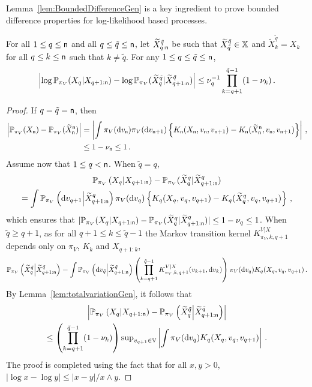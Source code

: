 \noindent
Lemma~\ref{lem:BoundedDifferenceGen} is a key ingredient to prove bounded difference properties for log-likelihood based processes.
\begin{lemma}\label{lem:BoundedDifferenceGen}
For all $1\le q\le {\mathsf n}$ and all $q\le \tilde{q}\le {\mathsf n}$, let $\widetilde{X}_{q:{\mathsf n}}^{\tilde{q}}$ be  such that $\widetilde{X}_{\tilde{q}}^{\tilde{q}}\in \mathbb{X}$ and $\widetilde{X}_k^{\tilde{q}} = X_k$ for all $q\le k\le {\mathsf n}$ such that $k\neq \tilde{q}$. 
For any $1\le q\le \tilde{q}\le {\mathsf n}$,
\[
\left|\log \mathbb{P}_{\pi_V}(X_{q}|X_{q+1:{\mathsf n}}) - \log \mathbb{P}_{\pi_V}(\widetilde{X}_{q}^{\tilde{q}}|\widetilde{X}_{q+1:{\mathsf n}}^{\tilde{q}})\right| \leq \nu_q^{-1}\prod_{k = q+1}^{\tilde{q}-1}(1-\nu_k)\,.
\]
\end{lemma}

\begin{proof}
If $q = \tilde q = {\mathsf n}$, then 
\begin{align*}
\absj{\bP_{\pi_V}(X_{\nobs}) - \bP_{\pi_V}(\widetilde{X}_{\nobs}^{\nobs})} &=  \absj{\int \pi_V(\rmd v_{\nobs})\pi_V(\rmd v_{\nobs+1})\left\{K_{\nobs}(X_\nobs,v_\nobs,v_{\nobs+1})-K_\nobs(\widetilde{X}^{\nobs}_\nobs,v_\nobs,v_{\nobs+1})\right\}}\eqsp,\\
& \le 1-\nu_\nobs\le 1\eqsp.
\end{align*}
Assume now that $1\le q <{\mathsf n}$. When $\tilde q = q$,
\begin{multline*}
\bP_{\pi_V}\left(X_{q}\middle|X_{q+1:\nobs}\right) - \bP_{\pi_V}(\widetilde{X}^{q}_{q}|\widetilde{X}^{q}_{q+1:\nobs}) \\
= \int \bP_{\pi_V}\left(\rmd v_{q+1}\middle | \widetilde{X}^{q}_{q+1:\nobs}\right) \pi_V(\rmd v_q)\left\{K_q(X_q,v_q,v_{q+1})-K_q(\widetilde{X}^{q}_q,v_q,v_{q+1})\right\}\eqsp,
\end{multline*}
which ensures that $|\mathbb{P}_{\pi_V}(X_{q}|X_{q+1:{\mathsf n}}) - \mathbb{P}_{\pi_V}(\widetilde{X}^{q}_{q}|\widetilde{X}^{q}_{q+1:{\mathsf n}})|\le 1- \nu_q\le 1$. When $\tilde q \ge q+1$, as for all $q+1\le k\le \tilde{q}-1$ the Markov transition kernel $K^{V|X}_{\pi_V,k,q+1}$ depends only on $\pi_V$, $K_k$ and $X_{q+1:k}$, 
\[
\mathbb{P}_{\pi_V}\left(\widetilde{X}^{\tilde{q}}_{q}\middle|\widetilde{X}^{\tilde{q}}_{q+1:{\mathsf n}}\right) = \int \mathbb{P}_{\pi_V}\left(\mathrm{d} v_{\tilde{q}}\middle | \widetilde{X}^{\tilde{q}}_{q+1:{\mathsf n}}\right) \left(\prod_{k = q+1}^{\tilde{q}-1}K^{V|X}_{\pi_V,k,q+1}(v_{k+1},\mathrm{d} v_k)\right) \pi_V(\mathrm{d} v_q)K_q(X_q,v_q,v_{q+1})\,.
\]
By Lemma~\ref{lem:totalvariationGen}, it follows that
\begin{multline*}
\left|\bP_{\pi_V}\left(X_{q}\middle|X_{q+1:\nobs}\right)-\bP_{\pi_V}\left(\widetilde{X}^{\tilde{q}}_{q}\middle|\widetilde{X}^{\tilde{q}}_{q+1:\nobs}\right)\right| \\
\le \left(\prod_{k = q+1}^{\tilde{q}-1}(1-\nu_k)\right) \sup_{v_{q+1}\in\Vset}\left|\int\pi_V(\rmd v_q)K_q(X_q,v_q,v_{q+1})\right|\eqsp.
\end{multline*}
The proof is completed using the fact that 
for all $x,y>0$, $|\log x - \log y| \le |x-y|/x\wedge y$. 
\end{proof}

